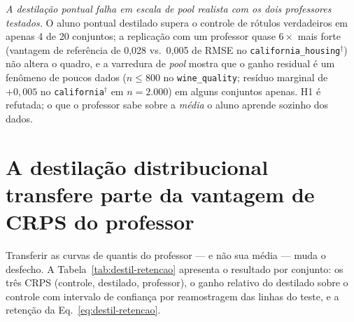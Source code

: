 \emph{A destilação pontual falha em escala de \emph{pool} realista
com os dois professores testados.} O aluno pontual destilado supera o
controle de rótulos verdadeiros em apenas 4 de 20 conjuntos; a
replicação com um professor quase $6\times$ mais forte (vantagem de referência de
0,028 vs.\ 0,005 de RMSE no \texttt{california\_\allowbreak housing}$^\dagger$) não altera o
quadro, e a varredura de \emph{pool} mostra que o ganho residual é um
fenômeno de poucos dados ($n \leq 800$ no \texttt{wine\_quality};
resíduo marginal de $+0{,}005$ no \texttt{california}$^\dagger$ em
$n{=}2.000$) em alguns conjuntos apenas.
H1 é refutada; o que o professor sabe sobre a \emph{média} o aluno
aprende sozinho dos dados.

\section{A destilação distribucional transfere parte da vantagem de
CRPS do professor}
\label{sec:destil-dist}

Transferir as curvas de quantis do professor --- e não sua média ---
muda o desfecho. A Tabela~\ref{tab:destil-retencao} apresenta o
resultado por conjunto: os três CRPS (controle, destilado, professor),
o ganho relativo do destilado sobre o controle com intervalo de
confiança por reamostragem das linhas do teste, e a retenção da
Eq.~\ref{eq:destil-retencao}.


